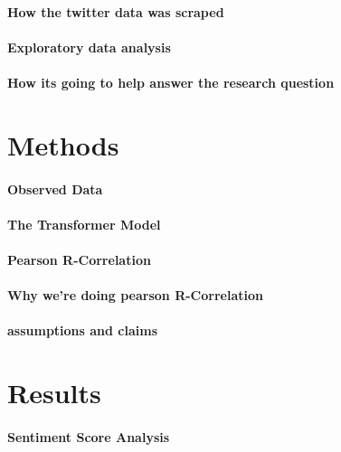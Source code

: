 \documentclass[12pt]{article}
\begin{document}
\paragraph{How the twitter data was scraped}

\paragraph{Exploratory data analysis}

\paragraph{How its going to help answer the research question}


\section{Methods}

\paragraph{Observed Data}

\paragraph{The Transformer Model}

\paragraph{Pearson R-Correlation}

\paragraph{Why we're doing pearson R-Correlation}

\paragraph{assumptions and claims}

\section{Results}
\paragraph{Sentiment Score Analysis}
\end{document}
